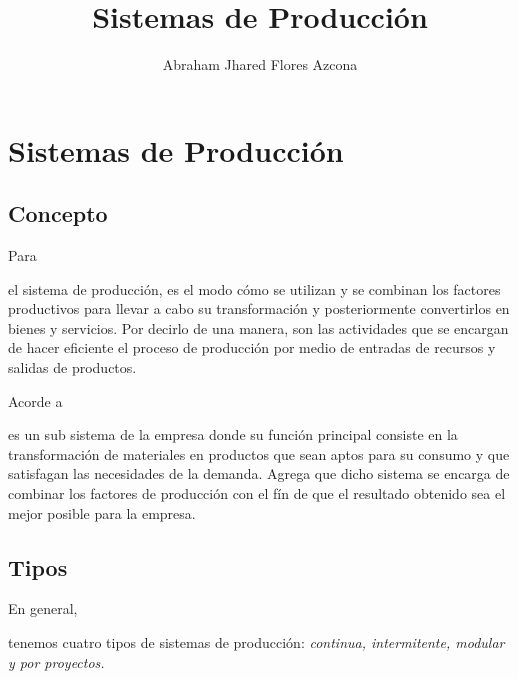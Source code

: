 \documentclass[stu, 12pt, letterpaper, donotrepeattitle, floatsintext, natbib]{apa7}
\title{\Large Sistemas de Producción}
\author{Abraham Jhared Flores Azcona} %
\affiliation{Instituto Tecnológico de Tijuana}
\begin{document}
\maketitle


\renewcommand\contentsname{Contenido}
\tableofcontents
\renewcommand{\listfigurename}{Figuras}
\listoffigures

\newpage
\section{Sistemas de Producción}
\subsection{Concepto}
Para \begin{justifying}  %
    \cite{quiroa-2020} el sistema de producción, es el modo cómo se utilizan y se combinan los factores productivos para llevar
    a cabo su transformación y posteriormente convertirlos en bienes y servicios. Por decirlo de una manera, son las
    actividades que se encargan de hacer eficiente el proceso de producción por medio de entradas de recursos y salidas de productos.\par
\end{justifying}
Acorde a \begin{justifying}
    \cite{unknown-author-no-date} es un sub sistema de la empresa donde su función principal consiste en la transformación de materiales
    en productos que sean aptos para su consumo y que satisfagan las necesidades de la demanda. Agrega que dicho sistema
    se encarga de combinar los factores de producción con el fín de que el resultado obtenido sea el mejor posible para la empresa.\par
\end{justifying}
\vspace{\baselineskip}
\subsection{Tipos}
En general, \begin{justifying}
    tenemos cuatro tipos de sistemas de producción: \emph{continua, intermitente, modular y por proyectos.} \citep{unknown-author-1995}\par %
\end{justifying}
\vspace{\baselineskip}
\end{document}
